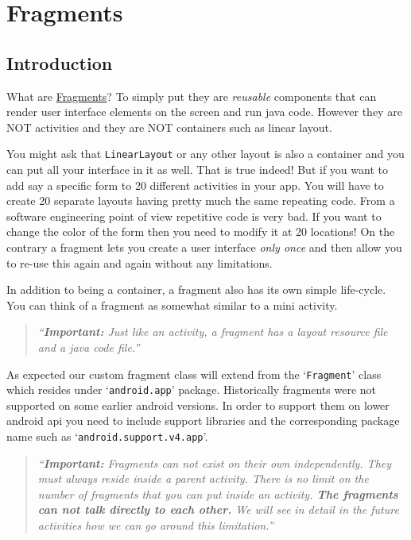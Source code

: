 \chapter{Fragments}
\label{FRAG}

\section{Introduction}
\label{FRAG:introduction}
What are \href{https://developer.android.com/guide/components/fragments.html}{Fragments}? To simply put they are \textit{reusable} components that can render user interface elements on the screen and run java code. However they are NOT activities and they are NOT containers such as linear layout.

You might ask that \texttt{LinearLayout} or any other layout is also a container and you can put all your interface in it as well. That is true indeed! But if you want to add say a specific form to 20 different activities in your app. You will have to create 20 separate layouts having pretty much the same repeating code. From a software engineering point of view repetitive code is very bad. If you want to change the color of the form then you need to modify it at 20 locations! On the contrary a fragment lets
you create a user interface \textit{only once} and then allow you to re-use this again and again without any limitations. 

In addition to being a container, a fragment also has its own simple life-cycle. You can think of a fragment as somewhat similar to a mini activity.

\begin{quote}
	\textit{``\textbf{Important:} Just like an activity, a fragment has a layout resource file and a java code file.''}
\end{quote}

As expected our custom fragment class will extend from the `\texttt{Fragment}' class which resides under `\texttt{android.app}' package. Historically fragments were not supported on some earlier android versions. In order to support them on lower android api you need to include support libraries and the corresponding package name such as `\texttt{android.support.v4.app}'.

\begin{quote}
	\textit{``\textbf{Important:} Fragments can not exist on their own independently. They must always reside inside a parent activity. There is no limit on the number of fragments that you can put inside an activity. \textbf{The fragments can not talk directly to each other.} We will see in detail in the future activities how we can go around this limitation.''}
\end{quote}

